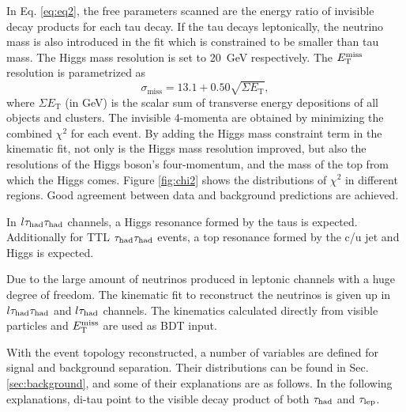 %

In Eq. \ref{eq:eq2}, the free parameters scanned are the energy ratio of invisible decay products for each tau decay. If the tau decays leptonically, the neutrino mass is also introduced in the fit which is constrained to be smaller than tau mass.
The Higgs mass resolution is set to 20~GeV respectively. The $E_{\text{T}}^{\text{miss}}$ resolution is parametrized as
\begin{equation}
\sigma_{\text{miss}}=13.1 + 0.50\sqrt{\Sigma E_\text{T}},
\label{eq:eq7}
\end{equation}
where $\Sigma E_\text{T}$ (in GeV) is the scalar sum of transverse energy depositions of all objects and clusters. The invisible 4-momenta are obtained by minimizing the combined $\chi^2$ for each event. By adding the Higgs mass constraint term in the kinematic fit, not only is the Higgs mass resolution improved, but also the resolutions of the Higgs boson's four-momentum, and the mass of the top from which the Higgs comes. Figure \ref{fig:chi2} shows the distributions of $\chi^2$ in different regions. Good agreement between data and background predictions are achieved.



In $l\tau_\text{had}{}\tau_\text{had}$ channels, a Higgs resonance formed by the taus is expected. Additionally for TTL $\tau_\text{had}{}\tau_\text{had}$ events, a top resonance formed by the c/u jet and Higgs is expected.

Due to the large amount of neutrinos produced in leptonic channels with a huge degree of freedom. The kinematic fit to reconstruct the neutrinos is given up in $l\tau_\text{had}{}\tau_\text{had}$ and $l\tau_\text{had}$ channels. The kinematics calculated directly from visible particles and $E_{\text{T}}^{\text{miss}}$ are used as BDT input.

With the event topology reconstructed, a number of variables are defined for signal and background separation. Their distributions can be found in Sec. \ref{sec:background}, and some of their explanations are as follows. In the following explanations, di-tau point to the visible decay product of both $\tau_\text{had}$ and $\tau_\text{lep}$.

